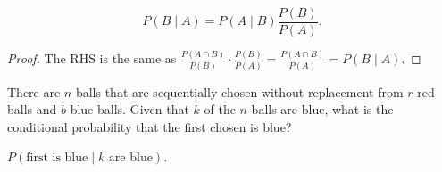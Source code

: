 \begin{lemma}
	\[
		P(B\mid A)=P(A\mid B)\frac{P(B)}{P(A)}
	.\] 
\end{lemma}
\begin{proof}
	The RHS is the same as \( \frac{P(A \cap B)}{P(B)} \cdot \frac{P(B)}{P(A)} = \frac{P(A \cap B)}{P(A)} = P(B\mid A) \).
\end{proof}

\begin{eg}
	There are \( n \) balls that are sequentially chosen without replacement from \( r \) red balls and \( b \) blue balls. Given that \( k \) of the \( n \) balls are blue, what is the conditional probability that the first chosen is blue?
\end{eg}
\begin{explanation}
	\( P(\text{first is blue} \mid k\text{ are blue}) \).
\end{explanation}
